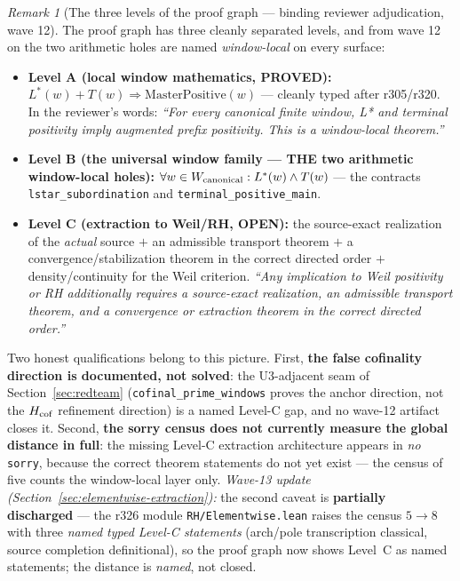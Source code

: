 \documentclass[11pt]{article}
\theoremstyle{definition}
\theoremstyle{remark}
\newtheorem{remark}[theorem]{Remark}
\begin{document}
\begin{remark}[The three levels of the proof graph --- binding
reviewer adjudication, wave 12]\label{rem:threelevels}
The proof graph has three cleanly separated levels, and from wave 12
on the two arithmetic holes are named \emph{window-local} on every
surface:
\begin{itemize}[leftmargin=2em]
\item \textbf{Level A (local window mathematics, PROVED):}
$L^*(w) + T(w) \Rightarrow \mathrm{MasterPositive}(w)$ --- cleanly
typed after r305/r320.  In the reviewer's words: \emph{``For every
canonical finite window, L* and terminal positivity imply augmented
prefix positivity.  This is a window-local theorem.''}
\item \textbf{Level B (the universal window family --- THE two
arithmetic window-local holes):} $\forall w \in W_{\rm canonical}:
L^*(w) \wedge T(w)$ --- the contracts
\texttt{lstar\_subordination} and \texttt{terminal\_positive\_main}.
\item \textbf{Level C (extraction to Weil/RH, OPEN):} the
source-exact realization of the \emph{actual} source $+$ an
admissible transport theorem $+$ a convergence/stabilization theorem
in the correct directed order $+$ density/continuity for the Weil
criterion.  \emph{``Any implication to Weil positivity or RH
additionally requires a source-exact realization, an admissible
transport theorem, and a convergence or extraction theorem in the
correct directed order.''}
\end{itemize}
Two honest qualifications belong to this picture.  First, \textbf{the
false cofinality direction is documented, not solved}: the U3-adjacent
seam of Section~\ref{sec:redteam} (\texttt{cofinal\_prime\_windows}
proves the anchor direction, not the $H_{\rm cof}$ refinement
direction) is a named Level-C gap, and no wave-12 artifact closes it.
Second, \textbf{the sorry census does not currently measure the
global distance in full}: the missing Level-C extraction architecture
appears in \emph{no} \texttt{sorry}, because the correct theorem
statements do not yet exist --- the census of five counts the
window-local layer only.  \emph{Wave-13 update
(Section~\ref{sec:elementwise-extraction}):} the second caveat is
\textbf{partially discharged} --- the r326 module
\texttt{RH/Elementwise.lean} raises the census $5 \to 8$ with three
\emph{named typed Level-C statements} (arch/pole transcription
classical, source completion definitional), so the proof graph now
shows Level~C as named statements; the distance is \emph{named},
not closed.
\end{remark}
\end{document}
